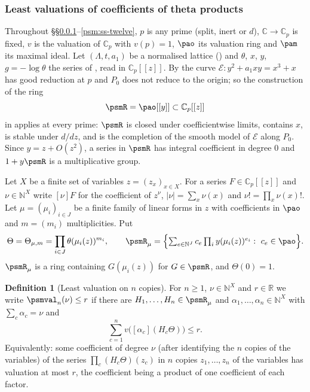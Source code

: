 \documentclass[10pt]{amsart}
\theoremstyle{definition}
\newtheorem{definition}[theorem]{Definition}
\theoremstyle{remark}
\newcommand{\C}{\mathbb C}
\newcommand{\R}{\mathbb R}
\newcommand{\N}{\mathbb N}
\begin{document}
\subsubsection{Least valuations of coefficients of theta products}\label{psm:ss-least}

Throughout \S\S\ref{psm:ss-least}--\ref{psm:ss-twelve}, $p$ is any prime (split, inert or $d$),
$\C\to\C_p$ is fixed, $v$ is the valuation of $\C_p$ with $v(p)=1$, $\pao$ its valuation ring and
$\pam$ its maximal ideal. Let $(\Lambda,t,a_1)$ be a normalised lattice ({\cite[\S7.1]{P49}}) and
$\theta$, $x$, $y$, $g=-\log\theta$ the series of {\cite[\S4.3]{P49}}, read in $\C_p[[z]]$. By
{\cite[Lemma~7.2]{P49}} the curve $\mathcal E\colon y^2+a_1xy=x^3+x$ has good reduction at $p$ and $P_0$
does not reduce to the origin; so the construction of the ring
\[
\psmR=\pao[[y]]\subset\C_p[[z]]
\]
in {\cite[\S4.3]{P49}} applies at every prime: $\psmR$ is closed under coefficientwise limits,
contains $x$, is stable under $d/dz$, and is the completion of the smooth model of $\mathcal E$
along $P_0$. Since $y=z+O(z^2)$, a series in $\psmR$ has integral coefficient in degree $0$ and
$1+y\psmR$ is a multiplicative group.

Let $X$ be a finite set of variables $z=(z_x)_{x\in X}$. For a series $F\in\C_p[[z]]$ and
$\nu\in\N^X$ write $[\nu]F$ for the coefficient of $z^\nu$, $|\nu|=\sum_x\nu(x)$ and $\nu!=
\prod_x\nu(x)!$. Let $\mu=(\mu_i)_{i\in J}$ be a finite family of linear forms in $z$ with
coefficients in $\pao$ and $m=(m_i)$ multiplicities. Put
\[
\Theta=\Theta_{\mu,m}=\prod_{i\in J}\theta(\mu_i(z))^{m_i},\qquad
\psmR_\mu=\Bigl\{\textstyle\sum_{e\in\N^J}c_e\prod_iy(\mu_i(z))^{e_i}:\ c_e\in\pao\Bigr\}.
\]
$\psmR_\mu$ is a ring containing $G(\mu_i(z))$ for $G\in\psmR$, and $\Theta(0)=1$.

\begin{definition}[Least valuation on $n$ copies]\label{psm:def-val}
For $n\ge1$, $\nu\in\N^X$ and $r\in\R$ we write $\psmval_n(\nu)\le r$ if there are
$H_1,\dots,H_n\in\psmR_\mu$ and $\alpha_1,\dots,\alpha_n\in\N^X$ with $\sum_c\alpha_c=\nu$ and
\[
\sum_{c=1}^nv\bigl([\alpha_c](H_c\Theta)\bigr)\le r .
\]
Equivalently: some coefficient of degree $\nu$ (after identifying the $n$ copies of the variables)
of the series $\prod_c(H_c\Theta)(z_c)$ in $n$ copies $z_1,\dots,z_n$ of the variables has
valuation at most $r$, the coefficient being a product of one coefficient of each factor.
\end{definition}
\end{document}
